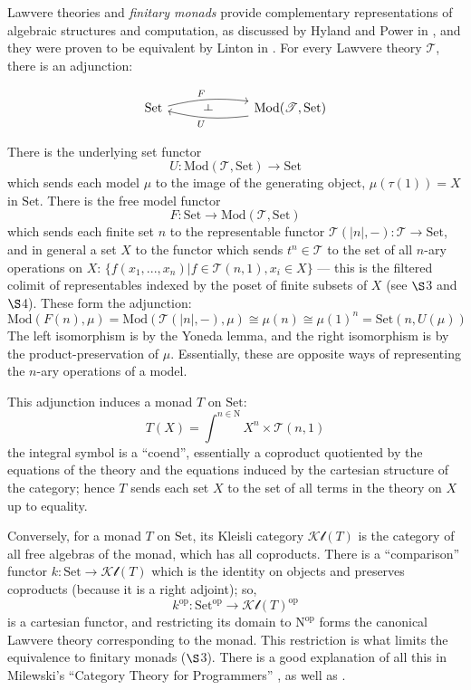 \documentclass{amsart}
\theoremstyle{definition}
\def\ld{\rotatebox[origin=c]{-90}{$\dashv$}} %
\newcommand{\Set}{\mathrm{Set}}
\newcommand{\Mod}{\mathrm{Mod}}
\newcommand{\op}{\mathrm{op}}
\newcommand{\NN}{\mathrm{N}}
\newcommand{\T}{\mathscr{T}}
\newcommand{\Kl}{\mathscr{Kl}}
\newcommand{\maps}{\colon}
\begin{document}
Lawvere theories and \textit{finitary monads} provide complementary representations of algebraic structures and computation, as discussed by Hyland and Power in \cite{ltam}, and they were proven to be equivalent by Linton in \cite{linton}. For every Lawvere theory $\T$, there is an adjunction:

\[\begin{tikzcd}
	\Set \arrow[bend left=10,below]{rr}{F}
	& \ld &
	\arrow[bend left=10,above]{ll}{U} \Mod(\T,\Set)
\end{tikzcd}\]

There is the underlying set functor $$U\maps \Mod(\T,\Set) \to \Set$$ which sends each model $\mu$ to the image of the generating object, $\mu(\tau(1)) = X$ in $\Set$. There is the free model functor $$F\maps\Set \to \Mod(\T,\Set)$$ which sends each finite set $n$ to the representable functor $\T(|n|,-)\maps\T \to \Set$, and in general a set $X$ to the functor which sends $t^n \in \T$ to the set of all $n$-ary operations on $X$: $\{f(x_1,...,x_n)|f\in \T(n,1), x_i\in X\}$ --- this is the filtered colimit of representables indexed by the poset of finite subsets of $X$ \cite{nlab}(see $\S$3 and $\S$4). These form the adjunction: $$\Mod(F(n),\mu) = \Mod(\T(|n|,-),\mu) \cong \mu(n) \cong \mu(1)^n = \Set(n,U(\mu))$$ The left isomorphism is by the Yoneda lemma, and the right isomorphism is by the product-preservation of $\mu$. Essentially, these are opposite ways of representing the $n$-ary operations of a model.

This adjunction induces a monad $T$ on $\Set$:
\begin{equation}
T(X) = \int^{n\in \NN} X^n \times \T(n,1)
\end{equation}
the integral symbol is a ``coend'', essentially a coproduct quotiented by the equations of the theory and the equations induced by the cartesian structure of the category; hence $T$ sends each set $X$ to the set of all terms in the theory on $X$ up to equality.

Conversely, for a monad $T$ on $\Set$, its Kleisli category $\Kl(T)$ is the category of all free algebras of the monad, which has all coproducts. There is a ``comparison'' functor $k\maps \Set \to \Kl(T)$ which is the identity on objects and preserves coproducts (because it is a right adjoint); so, $$k^{\op}\maps \Set^{\op} \to \Kl(T)^{\op}$$ is a cartesian functor, and restricting its domain to $\NN^{\op}$ forms the canonical Lawvere theory corresponding to the monad. This restriction is what limits the equivalence to finitary monads ($\S$3). There is a good explanation of all this in Milewski's ``Category Theory for Programmers'' \cite{milew}, as well as \cite{ltdistlaw}.
\end{document}
